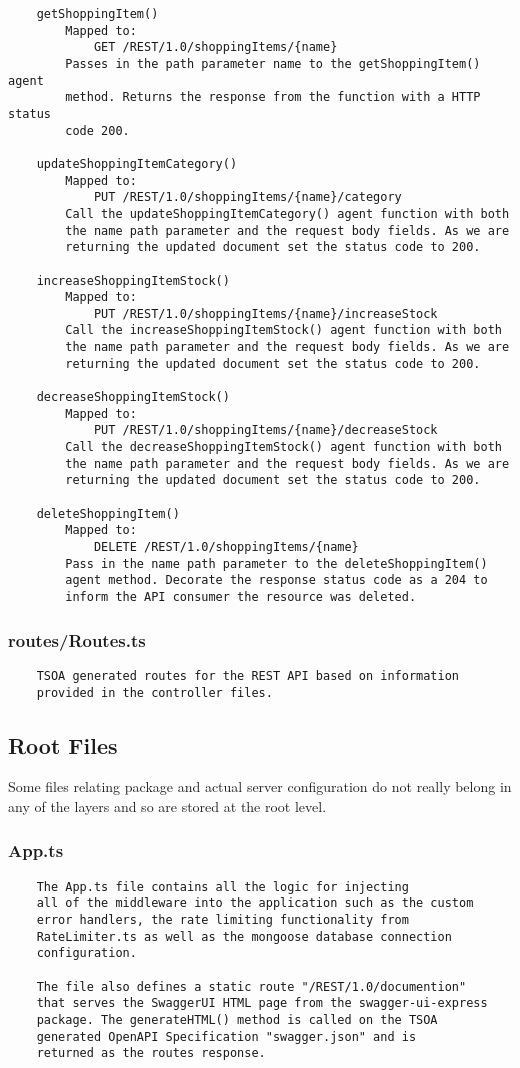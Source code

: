 \begin{verbatim}
    getShoppingItem()
        Mapped to:
            GET /REST/1.0/shoppingItems/{name}
        Passes in the path parameter name to the getShoppingItem() agent
        method. Returns the response from the function with a HTTP status
        code 200.
    
    updateShoppingItemCategory()
        Mapped to:
            PUT /REST/1.0/shoppingItems/{name}/category
        Call the updateShoppingItemCategory() agent function with both
        the name path parameter and the request body fields. As we are
        returning the updated document set the status code to 200.
        
    increaseShoppingItemStock()
        Mapped to:
            PUT /REST/1.0/shoppingItems/{name}/increaseStock
        Call the increaseShoppingItemStock() agent function with both
        the name path parameter and the request body fields. As we are
        returning the updated document set the status code to 200.
        
    decreaseShoppingItemStock()
        Mapped to:
            PUT /REST/1.0/shoppingItems/{name}/decreaseStock
        Call the decreaseShoppingItemStock() agent function with both
        the name path parameter and the request body fields. As we are
        returning the updated document set the status code to 200.
        
    deleteShoppingItem()
        Mapped to:
            DELETE /REST/1.0/shoppingItems/{name}
        Pass in the name path parameter to the deleteShoppingItem()
        agent method. Decorate the response status code as a 204 to
        inform the API consumer the resource was deleted. 
\end{verbatim}
\subsubsection{routes/Routes.ts}
\begin{verbatim}
    TSOA generated routes for the REST API based on information
    provided in the controller files.
\end{verbatim}
\subsection{Root Files}
Some files relating package and actual server configuration do not really belong in any of the layers and so are stored at the root level.
\subsubsection{App.ts}
\begin{verbatim}
    The App.ts file contains all the logic for injecting
    all of the middleware into the application such as the custom
    error handlers, the rate limiting functionality from 
    RateLimiter.ts as well as the mongoose database connection 
    configuration.
    
    The file also defines a static route "/REST/1.0/documention"
    that serves the SwaggerUI HTML page from the swagger-ui-express
    package. The generateHTML() method is called on the TSOA
    generated OpenAPI Specification "swagger.json" and is
    returned as the routes response.
\end{verbatim}
